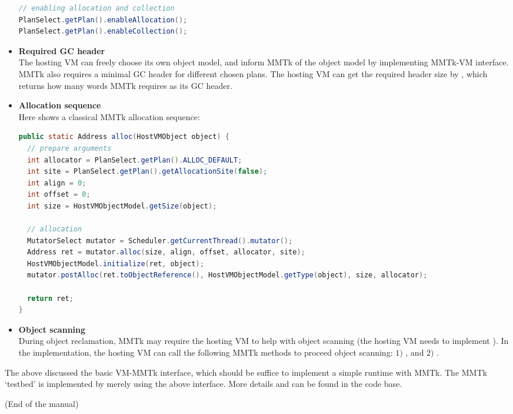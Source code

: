 \documentclass[12pt]{article}
\begin{document}
\begin{itemize}
\begin{lstlisting}[language=java]
// enabling allocation and collection
PlanSelect.getPlan().enableAllocation();
PlanSelect.getPlan().enableCollection();
\end{lstlisting}

\item
\textbf{Required GC header\\}
The hosting VM can freely choose its own object model,
and inform MMTk of the object model by implementing 
MMTk-VM interface. MMTk also requires a minimal GC
header for different chosen plans. The hosting
VM can get the required header size by 
,
which returns how many words MMTk requires as its
GC header. 

\item
\textbf{Allocation sequence\\}
Here shows a classical MMTk allocation sequence:
\begin{lstlisting}[language=java]
public static Address alloc(HostVMObject object) {
  // prepare arguments
  int allocator = PlanSelect.getPlan().ALLOC_DEFAULT; 
  int site = PlanSelect.getPlan().getAllocationSite(false); 
  int align = 0;
  int offset = 0;
  int size = HostVMObjectModel.getSize(object);

  // allocation
  MutatorSelect mutator = Scheduler.getCurrentThread().mutator(); 
  Address ret = mutator.alloc(size, align, offset, allocator, site);
  HostVMObjectModel.initialize(ret, object);
  mutator.postAlloc(ret.toObjectReference(), HostVMObjectModel.getType(object), size, allocator);
  
  return ret;
}
\end{lstlisting}

\item
\textbf{Object scanning\\}
During object reclamation, MMTk may require
the hosting VM to help with object scanning 
(the hosting VM needs to implement 
). 
In the implementation, the hosting VM can call the following
MMTk methods to proceed object scanning:
$1)$ , and 
$2)$ . 

\end{itemize}

The above discussed the basic VM-MMTk interface, which
should be suffice to implement a simple runtime with MMTk. 
The MMTk `testbed' is implemented by merely using the above
interface. More details and can be found in the code base. 

\vspace{2em}
\noindent
(End of the manual)
\clearpage
\end{document}

